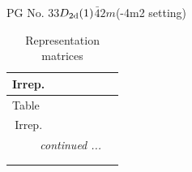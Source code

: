 \documentclass[fleqn,8pt,landscape]{jsarticle}
\begin{document}
\setcounter{MaxMatrixCols}{32}

\renewcommand{\tablename}{Table~}
\renewcommand{\figurename}{Figure~}
\begin{center}
\LARGE
PG No. 33\quad$D_{\rm 2d}(1)$\quad$\bar{4}2m$\quad(-4m2 setting)\quad[ tetragonal ]
\end{center}
\renewcommand{\arraystretch}{1.2}
\begin{longtable}{ccccccc}
\caption{Representation matrices}
 \\
 \hline \hline
Irrep. &  &  &  &  &  &  \\ \hline \endfirsthead

\multicolumn{6}{l}{\tablename\ \thetable{}} \\
 \hline \hline
Irrep. &  &  &  &  &  &  \\ \hline \endhead

 \hline \hline
\multicolumn{6}{r}{\footnotesize\it continued ...} \\ \endfoot

 \hline \hline
\multicolumn{6}{r}{} \\ \endlastfoot


\end{longtable}
\end{document}
